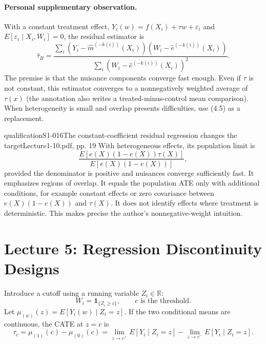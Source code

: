 \paragraph{Personal supplementary observation.}
With a constant treatment effect,
$Y_i(w)=f(X_i)+\tau w+\varepsilon_i$ and $E[\varepsilon_i\mid X_i,W_i]=0$, the residual estimator is
\[
\widehat\tau_R=\frac{\sum_i(Y_i-\widehat m^{(-k(i))}(X_i))(W_i-\widehat e^{(-k(i))}(X_i))}
{\sum_i(W_i-\widehat e^{(-k(i))}(X_i))^2}.
\tag{4.5 in the notes}
\]
The premise is that the nuisance components converge fast enough. Even if $\tau$ is not constant, this estimator converges to a nonnegatively weighted average of $\tau(x)$ (the annotation also writes a treated-minus-control mean comparison).
 When heterogeneity is small and overlap presents difficulties, use (4.5) as a replacement. 
\begin{reviewnote}{qualification}{S1-016}{The constant-coefficient residual regression changes the target}{Lecture1-10.pdf, pp. 19}
With heterogeneous effects, its population limit is
\[
\frac{E[e(X)(1-e(X))\tau(X)]}{E[e(X)(1-e(X))]},
\]
provided the denominator is positive and nuisances converge sufficiently fast. It emphasizes regions of overlap. It equals the population ATE only with additional conditions, for example constant effects or zero covariance between $e(X)(1-e(X))$ and $\tau(X)$. It does not identify effects where treatment is deterministic. This makes precise the author's nonnegative-weight intuition.
\end{reviewnote}


\section{Lecture 5: Regression Discontinuity Designs}
Introduce a cutoff using a running variable $Z_i\in\mathbb R$:
\[
W_i=\mathbf1_{\{Z_i\geq c\}},\qquad c\text{ is the threshold.}
\]
 Let $\mu_{(w)}(z)=E[Y_i(w)\mid Z_i=z]$. If the two conditional means are continuous, the CATE at $z=c$ is
\[
\tau_c=\mu_{(1)}(c)-\mu_{(0)}(c)
=\lim_{z\to c^+}E[Y_i\mid Z_i=z]-\lim_{z\to c^-}E[Y_i\mid Z_i=z].
\]
